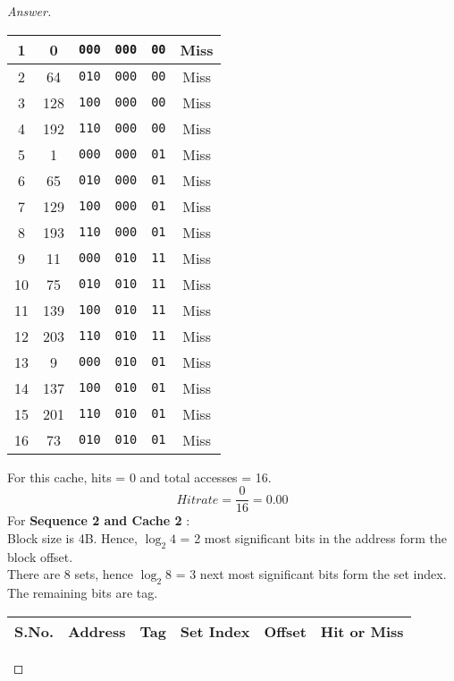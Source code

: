 \documentclass[12pt]{article}
\begin{document}
\begin{proof}[Answer]
\begin{center}
\begin{tabular}{||c | c |  c | c | c | c ||}
1 & 0 & \verb|000| & \verb|000| & \verb|00| & Miss \\ \hline
2 & 64 & \verb|010| & \verb|000| & \verb|00| & Miss \\ \hline
3 & 128 & \verb|100| & \verb|000| & \verb|00| & Miss \\ \hline 
4 & 192 & \verb|110| & \verb|000| & \verb|00| & Miss \\ \hline
5 & 1 & \verb|000| & \verb|000| & \verb|01| & Miss \\ \hline
6 & 65 & \verb|010| & \verb|000| & \verb|01| & Miss \\ \hline
7 & 129 & \verb|100| & \verb|000| & \verb|01| & Miss \\ \hline
8 & 193 & \verb|110| & \verb|000| & \verb|01| & Miss \\ \hline
9 & 11 & \verb|000| & \verb|010| & \verb|11| & Miss \\ \hline
10 & 75 & \verb|010| & \verb|010| & \verb|11| & Miss\\ \hline
11 & 139 & \verb|100| & \verb|010| & \verb|11| & Miss \\ \hline
12 & 203 & \verb|110| & \verb|010| & \verb|11| & Miss \\ \hline
13 & 9 & \verb|000| & \verb|010| & \verb|01| & Miss \\ \hline
14 & 137 & \verb|100| & \verb|010| & \verb|01| & Miss \\ \hline
15 & 201 & \verb|110| & \verb|010| & \verb|01| & Miss \\ \hline
16 & 73 & \verb|010| & \verb|010| & \verb|01| & Miss \\ \hline
\end{tabular}
\end{center}
For this cache, hits = 0 and total accesses = 16. \\
\[ Hit rate = \frac{0}{16} = 0.00 \] 
For \textbf{Sequence 2  and Cache 2 }: \\ 
Block size is 4B. Hence, $\log_2 4$ = 2 most significant bits in the address form the block offset. \\
There are 8 sets, hence $\log_2 8$ = 3 next most significant bits form the set index. \\
The remaining bits are tag. 
\begin{center}
\begin{tabular}{||c | c |  c | c | c | c ||}
\hline
\textbf{S.No.} & \textbf{Address} &  \textbf{Tag} &\textbf{Set Index} & \textbf{Offset} & \textbf{Hit or Miss } \\  \hline

\end{tabular}
\end{center}
\end{proof}
\end{document}
